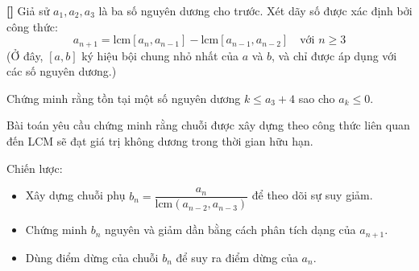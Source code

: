 \documentclass[../01-divisibility.tex]{subfiles}
\begin{document}
\begin{example*}\label{example:IRN-2015-TST-D3-P2}\textbf{[]}
	Giả sử \( a_1, a_2, a_3 \) là ba số nguyên dương cho trước. Xét dãy số được xác định bởi công thức:
	\[
		a_{n+1} = \text{lcm}[a_n, a_{n-1}] - \text{lcm}[a_{n-1}, a_{n-2}] \quad \text{với } n \geq 3
	\]
	(Ở đây, \( [a, b] \) ký hiệu bội chung nhỏ nhất của \( a \) và \( b \), và chỉ được áp dụng với các số nguyên dương.)

	Chứng minh rằng tồn tại một số nguyên dương \( k \leq a_3 + 4 \) sao cho \( a_k \leq 0 \).
\end{example*}

\begin{story*}
	Bài toán yêu cầu chứng minh rằng chuỗi được xây dựng theo công thức liên quan đến LCM sẽ đạt giá trị không dương trong thời gian hữu hạn.

	Chiến lược:
	\begin{itemize}[topsep=0pt, partopsep=0pt, itemsep=0pt]
		\item Xây dựng chuỗi phụ \( b_n = \dfrac{a_n}{\text{lcm}(a_{n-2}, a_{n-3})} \) để theo dõi sự suy giảm.
		\item Chứng minh \( b_n \) nguyên và giảm dần bằng cách phân tích dạng của \( a_{n+1} \).
		\item Dùng điểm dừng của chuỗi \( b_n \) để suy ra điểm dừng của \( a_n \).
	\end{itemize}
\end{story*}

\bigbreak
\end{document}
